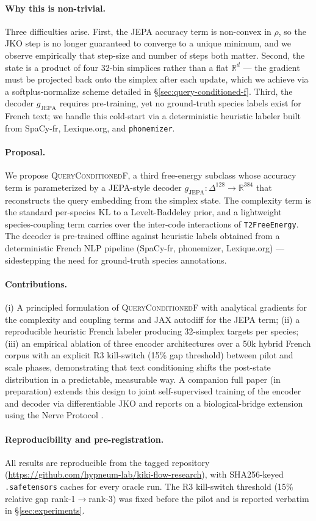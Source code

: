 \paragraph{Why this is non-trivial.} Three difficulties arise.
First, the JEPA accuracy term is non-convex in $\rho$, so the JKO
step is no longer guaranteed to converge to a unique minimum, and
we observe empirically that step-size and number of steps both
matter. Second, the state is a product of four 32-bin simplices
rather than a flat $\mathbb{R}^d$ --- the gradient must be projected
back onto the simplex after each update, which we achieve via a
softplus-normalize scheme detailed in \S\ref{sec:query-conditioned-f}.
Third, the decoder $g_{\mathrm{JEPA}}$ requires pre-training, yet no
ground-truth species labels exist for French text; we handle this
cold-start via a deterministic heuristic labeler built from
SpaCy-fr, Lexique.org, and \texttt{phonemizer}.

\paragraph{Proposal.} We propose \textsc{QueryConditionedF}, a
third free-energy subclass whose accuracy term is parameterized
by a JEPA-style decoder
$g_{\mathrm{JEPA}}: \Delta^{128} \to \mathbb{R}^{384}$ that
reconstructs the query embedding from the simplex state.
The complexity term is the standard per-species KL to a
Levelt-Baddeley prior, and a lightweight species-coupling term
carries over the inter-code interactions of \texttt{T2FreeEnergy}.
The decoder is pre-trained offline against heuristic labels
obtained from a deterministic French NLP pipeline (SpaCy-fr,
phonemizer, Lexique.org) --- sidestepping the need for ground-truth
species annotations.

\paragraph{Contributions.} (i) A principled formulation of
\textsc{QueryConditionedF} with analytical gradients for the
complexity and coupling terms and JAX autodiff for the JEPA term;
(ii) a reproducible heuristic French labeler producing 32-simplex
targets per species; (iii) an empirical ablation of three encoder
architectures over a 50k hybrid French corpus with an explicit
R3 kill-switch (15\% gap threshold) between pilot and scale phases,
demonstrating that text conditioning shifts the post-state
distribution in a predictable, measurable way. A companion full
paper (in preparation) extends this design to joint self-supervised
training of the encoder and decoder via differentiable JKO and
reports on a biological-bridge extension using the Nerve Protocol
\citep{saillant2026nervewml}.

\paragraph{Reproducibility and pre-registration.} All results are
reproducible from the tagged repository
(\url{https://github.com/hypneum-lab/kiki-flow-research}), with
SHA256-keyed \texttt{.safetensors} caches for every oracle run.
The R3 kill-switch threshold (15\% relative gap rank-1$\to$rank-3)
was fixed before the pilot and is reported verbatim in \S\ref{sec:experiments}.
